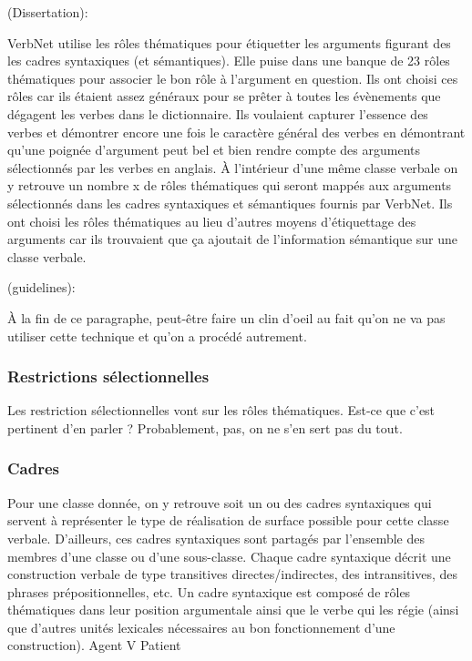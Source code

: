 (Dissertation):

VerbNet utilise les rôles thématiques pour étiquetter les arguments figurant des les cadres syntaxiques (et sémantiques). Elle puise dans une banque de 23 rôles thématiques pour associer le bon rôle à l'argument en question. Ils ont choisi ces rôles car ils étaient assez généraux pour se prêter à toutes les évènements que dégagent les verbes dans le dictionnaire. Ils voulaient capturer l'essence des verbes et démontrer encore une fois le caractère général des verbes en démontrant qu'une poignée d'argument peut bel et bien rendre compte des arguments sélectionnés par les verbes en anglais. À l'intérieur d'une même classe verbale on y retrouve un nombre x de rôles thématiques qui seront mappés aux arguments sélectionnés dans les cadres syntaxiques et sémantiques fournis par VerbNet. Ils ont choisi les rôles thématiques au lieu d'autres moyens d'étiquettage des arguments car ils trouvaient que ça ajoutait de l'information sémantique sur une classe verbale. 

(guidelines):

À la fin de ce paragraphe, peut-être faire un clin d'oeil au fait qu'on ne va pas utiliser cette technique et qu'on a procédé autrement.

\subsubsection{Restrictions sélectionnelles}

Les restriction sélectionnelles vont sur les rôles thématiques. Est-ce que c'est pertinent d'en parler ? Probablement, pas, on ne s'en sert pas du tout. 

\subsubsection{Cadres}

Pour une classe donnée, on y retrouve soit un ou des cadres syntaxiques qui servent à représenter le type de réalisation de surface possible pour cette classe verbale. D'ailleurs, ces cadres syntaxiques sont partagés par l'ensemble des membres d'une classe ou d'une sous-classe. Chaque cadre syntaxique décrit une construction verbale de type transitives directes/indirectes, des intransitives, des phrases prépositionnelles, etc. Un cadre syntaxique est composé de rôles thématiques dans leur position argumentale ainsi que le verbe qui les régie (ainsi que d'autres unités lexicales nécessaires au bon fonctionnement d'une construction).
Agent V Patient

